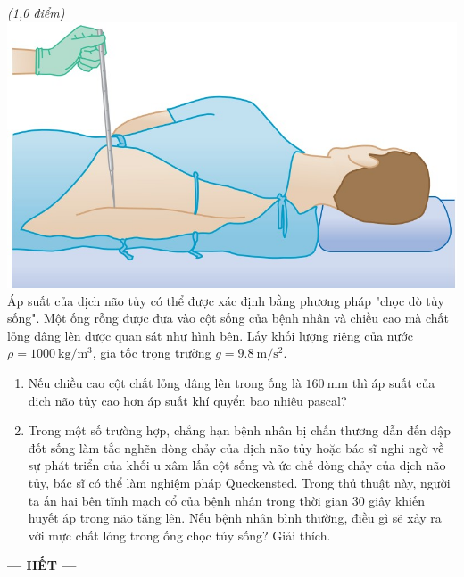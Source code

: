 \begin{ex} \textit{(1,0 điểm)}
{\includegraphics[scale=0.4]{../figs/D10-KTTX3-002-2}}
Áp suất của dịch não tủy có thể được xác định bằng phương pháp "chọc dò tủy sống". Một ống rỗng được đưa vào cột sống của bệnh nhân và chiều cao mà chất lỏng dâng lên được quan sát như hình bên. Lấy khối lượng riêng của nước $\rho=\SI{1000}{\kilogram/\meter^3}$, gia tốc trọng trường $g=\SI{9.8}{\meter/\second^2}$.
	\begin{enumerate}[label=\alph*)]
		\item Nếu chiều cao cột chất lỏng dâng lên trong ống là $\SI{160}{\milli\meter}$ thì áp suất của dịch não tủy cao hơn áp suất khí quyển bao nhiêu pascal?
		\item Trong một số trường hợp, chẳng hạn bệnh nhân bị chấn thương dẫn đến dập đốt sống làm tắc nghẽn dòng chảy của dịch não tủy hoặc bác sĩ nghi ngờ về sự phát triển của khối u xâm lấn cột sống và ức chế dòng chảy của dịch não tủy, bác sĩ có thể làm nghiệm pháp Queckensted. Trong thủ thuật này, người ta ấn hai bên tĩnh mạch cổ của bệnh nhân trong thời gian 30 giây khiến huyết áp trong não tăng lên. Nếu bệnh nhân bình thường, điều gì sẽ xảy ra với mực chất lỏng trong ống chọc tủy sống? Giải thích.
	\end{enumerate} 
	\loigiai{}
\end{ex}
\begin{center}
	\textbf{--- HẾT ---}
\end{center}